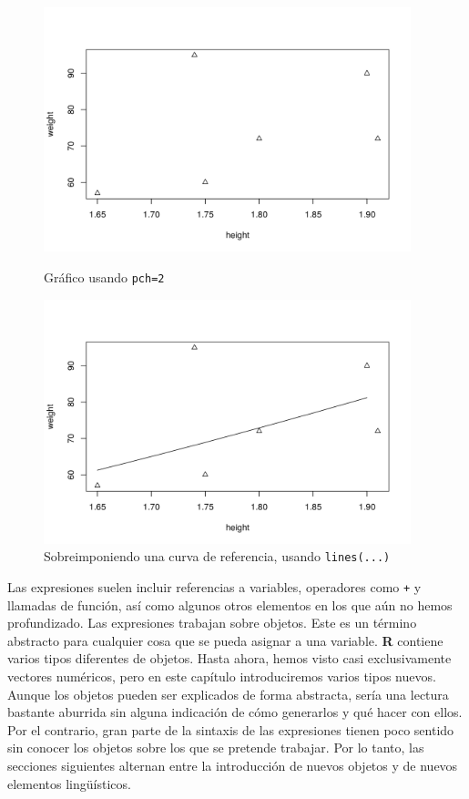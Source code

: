 \documentclass[spanish]{extbook}
\numberwithin{equation}{section}
\numberwithin{figure}{section}
\begin{document}
\newpage
\begin{figure}[!htb]
	\centering
	\includegraphics[width=0.95\textwidth]{fig-3.png}
	\caption{Gráfico usando \texttt{pch=2}}
	\label{fig:fig-3}
	\centering
	\includegraphics[width=0.95\textwidth]{fig-4.png}
	\caption{Sobreimponiendo una curva de referencia, usando \texttt{lines(...)}}
	\label{fig:fig-4}
\end{figure}
\newpage

Las expresiones suelen incluir referencias a variables, operadores como
\texttt{+} y llamadas de función, así como algunos otros elementos en los que
aún no hemos profundizado.  Las expresiones trabajan sobre objetos. Este es un
término abstracto para cualquier cosa que se pueda asignar a una variable. \textbf{R}
contiene varios tipos diferentes de objetos. Hasta ahora, hemos visto casi
exclusivamente vectores numéricos, pero en este capítulo introduciremos varios
tipos nuevos.  Aunque los objetos pueden ser explicados de forma abstracta,
sería una lectura bastante aburrida sin alguna indicación de cómo generarlos y
qué hacer con ellos. Por el contrario, gran parte de la sintaxis de las
expresiones tienen poco sentido sin conocer los objetos sobre los que se pretende
trabajar. Por lo tanto, las secciones siguientes alternan entre la introducción
de nuevos objetos y de nuevos elementos lingüísticos.
\end{document}
